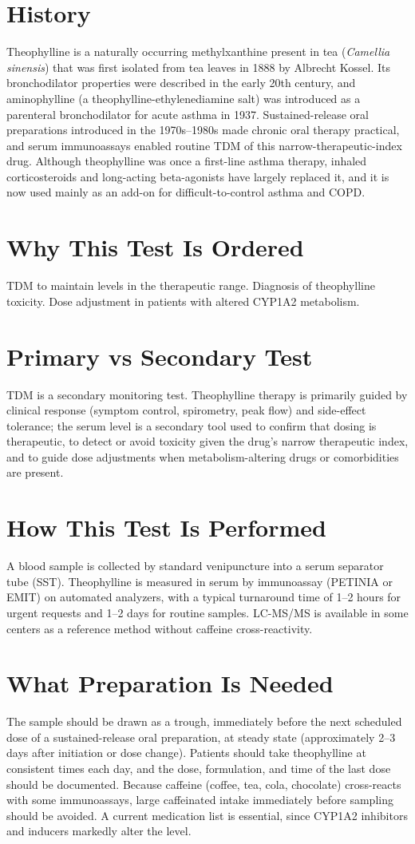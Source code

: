 \section*{History}
Theophylline is a naturally occurring methylxanthine present in tea (\textit{Camellia sinensis}) that was first isolated from tea leaves in 1888 by Albrecht Kossel. Its bronchodilator properties were described in the early 20th century, and aminophylline (a theophylline-ethylenediamine salt) was introduced as a parenteral bronchodilator for acute asthma in 1937. Sustained-release oral preparations introduced in the 1970s--1980s made chronic oral therapy practical, and serum immunoassays enabled routine TDM of this narrow-therapeutic-index drug. Although theophylline was once a first-line asthma therapy, inhaled corticosteroids and long-acting beta-agonists have largely replaced it, and it is now used mainly as an add-on for difficult-to-control asthma and COPD.
\section*{Why This Test Is Ordered}
TDM to maintain levels in the therapeutic range. Diagnosis of theophylline toxicity. Dose adjustment in patients with altered CYP1A2 metabolism.
\section*{Primary vs Secondary Test}
TDM is a secondary monitoring test. Theophylline therapy is primarily guided by clinical response (symptom control, spirometry, peak flow) and side-effect tolerance; the serum level is a secondary tool used to confirm that dosing is therapeutic, to detect or avoid toxicity given the drug's narrow therapeutic index, and to guide dose adjustments when metabolism-altering drugs or comorbidities are present.
\section*{How This Test Is Performed}
A blood sample is collected by standard venipuncture into a serum separator tube (SST). Theophylline is measured in serum by immunoassay (PETINIA or EMIT) on automated analyzers, with a typical turnaround time of 1--2 hours for urgent requests and 1--2 days for routine samples. LC-MS/MS is available in some centers as a reference method without caffeine cross-reactivity.
\section*{What Preparation Is Needed}
The sample should be drawn as a trough, immediately before the next scheduled dose of a sustained-release oral preparation, at steady state (approximately 2--3 days after initiation or dose change). Patients should take theophylline at consistent times each day, and the dose, formulation, and time of the last dose should be documented. Because caffeine (coffee, tea, cola, chocolate) cross-reacts with some immunoassays, large caffeinated intake immediately before sampling should be avoided. A current medication list is essential, since CYP1A2 inhibitors and inducers markedly alter the level.
